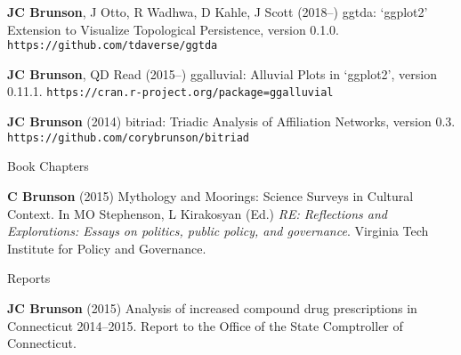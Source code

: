 \documentclass[10pt,a4paper]{article}
\begin{document}
\begin{enumerate}[label={[\arabic*]},labelindent=1cm,nolistsep]
\item
{\bfseries JC Brunson}, J Otto, R Wadhwa, D Kahle, J Scott (2018--) {\sffamily ggtda}: `ggplot2' Extension to Visualize Topological Persistence, version 0.1.0. {\tt\small\nolinkurl{https://github.com/tdaverse/ggtda}}
\item
{\bfseries JC Brunson}, QD Read (2015--) {\sffamily ggalluvial}: Alluvial Plots in `ggplot2', version 0.11.1. {\tt\small\nolinkurl{https://cran.r-project.org/package=ggalluvial}}
\item
{\bfseries JC Brunson} (2014) {\sffamily bitriad}: Triadic Analysis of Affiliation Networks, version 0.3. {\tt\small\nolinkurl{https://github.com/corybrunson/bitriad}}
\setcounter{paper}{\value{enumi}}
\end{enumerate}
%
\vspace{.25cm}
{\sc Book Chapters}
\begin{enumerate}[label={[\arabic*]},labelindent=1cm,nolistsep]
\item
{\bfseries C Brunson} (2015) Mythology and Moorings: Science Surveys in Cultural Context. In MO Stephenson, L Kirakosyan (Ed.) {\itshape RE: Reflections and Explorations: Essays on politics, public policy, and governance}. Virginia Tech Institute for Policy and Governance.
\setcounter{paper}{\value{enumi}}
\end{enumerate}
%
\vspace{.25cm}
{\sc Reports}
\begin{enumerate}[label={[\arabic*]},labelindent=1cm,nolistsep]
\item
{\bfseries JC Brunson} (2015) Analysis of increased compound drug prescriptions in Connecticut 2014--2015. Report to the Office of the State Comptroller of Connecticut.
\setcounter{paper}{\value{enumi}}
\end{enumerate}

\end{document}
